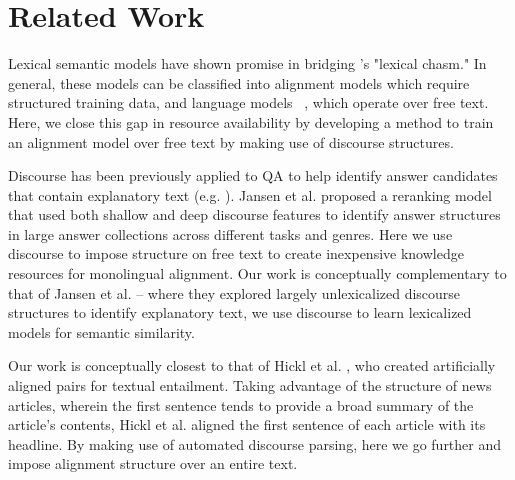 
\section{Related Work}
\label{sec-naacl2015:related work}


Lexical semantic models have shown promise in bridging \citet{Berger:00}'s "lexical chasm."  In general, these models can be classified into alignment models \citep{echihabi2003noisy,Soricut:06,Riezler:etal:2007,Surdeanu:11,yao2013} which require structured training data, and language models ~\citep{jansen14,sultan-etal:2014:TACL,yih13}, which operate over free text.  Here, we close this gap in resource availability by developing a method to train an alignment model over free text by making use of discourse structures. 

  
  

Discourse has been previously applied to QA to help identify answer candidates that contain explanatory text (e.g. \citet{Verberne:2007}).
Jansen et al. \citeyear{jansen14} proposed a reranking model that used both shallow and deep discourse features to identify answer structures in large answer collections across different tasks and genres.  Here we use discourse to impose structure on free text to create inexpensive knowledge resources for monolingual alignment. Our work is conceptually complementary to that of Jansen et al. -- where they explored largely unlexicalized discourse structures to identify explanatory text, we use discourse to learn lexicalized models for semantic similarity.

Our work is conceptually closest to that of Hickl et al. \citeyear{hickl2006recognizing}, who created artificially aligned pairs for textual entailment.  Taking advantage of the structure of news articles, wherein the first sentence tends to provide a broad summary of the article's contents, Hickl et al. aligned the first sentence of each article with its headline.  By making use of automated discourse parsing, here we go further and impose alignment structure over an entire text.



